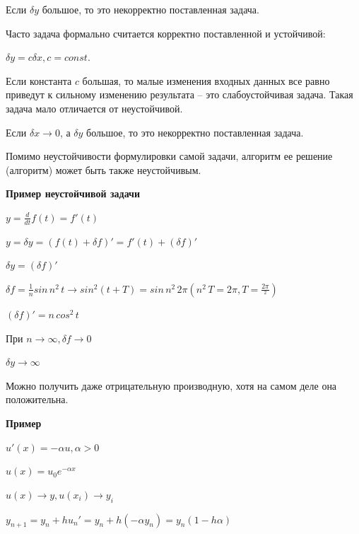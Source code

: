 \documentclass[a4paper,14pt]{article}
\begin{document}
Если $\delta y$ большое, то это некорректно поставленная задача.

Часто задача формально считается корректно поставленной
и устойчивой:

$\delta y = c \delta x, c = const.$

Если константа $c$ большая, то малые изменения входных данных
все равно приведут к сильному изменению результата -- 
это слабоустойчивая задача. Такая задача мало отличается
от неустойчивой.

Если $\delta x \rightarrow 0$, а $\delta y$ большое,
то это некорректно поставленная задача.

Помимо неустойчивости формулировки самой задачи, алгоритм
ее решение (алгоритм) может быть также неустойчивым.

\textbf{Пример неустойчивой задачи}

$y = \frac{d}{dt} f(t) = f'(t)$

$y = \delta y = (f(t) + \delta f)' = f'(t) + (\delta f)'$

$\delta y = (\delta f)'$

$\delta f = \frac{1}{n} sin \, n^2 \, t \rightarrow sin^2 (t + T) = sin \, n^2 \, 2 \pi (n^2 \,T =2 \pi, T = \frac{2 \pi}{^2} )$

$(\delta f)' = n \, cos^2 \, t$

При $n \rightarrow \infty, \delta f \rightarrow 0$

$\delta y \rightarrow \infty$

Можно получить даже отрицательную производную, хотя на самом деле она положительна.

\textbf{Пример}

$u'(x) = - \alpha u, \alpha > 0$

$u(x) = u_0 e ^{-\alpha x}$

\begin{figure}[!h]
	\label{fig:pr1}
\end{figure}
\newpage
$u(x) \rightarrow y, u(x_i) \rightarrow y_i$

$y_{n+1} = y_n + h u_n' = y_n + h (- \alpha y_n) = y_n (1 - h \alpha)$
\end{document}
